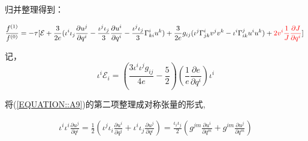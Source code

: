\documentclass[LBMDerivation.tex]{subfiles}
\begin{document}



归并整理得到：


\begin{equation}
  \begin{gathered}
    \frac{f^{(1)}}{f^{(0)}}=
    -\tau [ \mathcal{E}
    +\frac{3}{2e}(\iota^i \iota_j \frac{\partial u^j}{\partial q^i} -\frac{\iota^j\iota_j}{3}\frac{\partial u^i}{\partial q^i}-\frac{\iota^j\iota_j}{3} \Gamma_{ki}^i u^k)
    + \frac{3}{2e} g_{ij} (\iota^j\Gamma_{j k}^{i} v^j v^k - \iota^i\Gamma_{i k}^{j} u^i u^k) + {\color{red} 2v^i  \frac{1}{J}\frac{\partial J}{\partial q^i}}
    ]
  \end{gathered}
  \label{EQUATION::A9} ~
\end{equation}

记，
$$
  \iota^i \mathcal{E}_i= (\frac{3 {\iota^i\iota^jg_{ij}}}{4e}-\frac{5}{2}) (\frac{1}{e}\frac{\partial e}{\partial q^i})\iota^i
$$


将(\ref{EQUATION::A9})的第二项整理成对称张量的形式,


\begin{equation}
  \begin{gathered}
    \iota^i \iota^i \frac{\partial u^j}{\partial q^i} =\frac{1}{2} (\iota^j \iota_i \frac{\partial u^i}{\partial q^j}+  \iota^i \iota_j \frac{\partial u^j}{\partial q^i})
    = \frac{\iota_i \iota_j}{2} (g^{jm} \frac{\partial u^i}{\partial q^m}+g^{im} \frac{\partial u^j}{\partial q^m})
  \end{gathered}
\end{equation}
\end{document}
